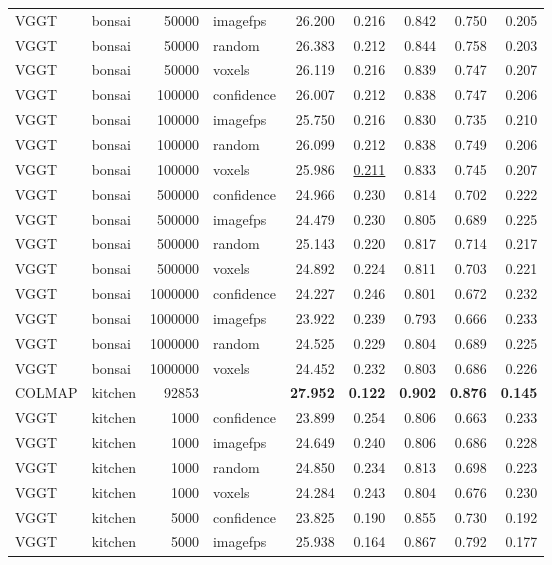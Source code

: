 \begin{table}[H]
\begin{tabular}{llrlrrrrr}
VGGT & bonsai & 50000 & imagefps & 26.200 & 0.216 & 0.842 & 0.750 & 0.205 \\
VGGT & bonsai & 50000 & random & 26.383 & 0.212 & 0.844 & 0.758 & 0.203 \\
VGGT & bonsai & 50000 & voxels & 26.119 & 0.216 & 0.839 & 0.747 & 0.207 \\
VGGT & bonsai & 100000 & confidence & 26.007 & 0.212 & 0.838 & 0.747 & 0.206 \\
VGGT & bonsai & 100000 & imagefps & 25.750 & 0.216 & 0.830 & 0.735 & 0.210 \\
VGGT & bonsai & 100000 & random & 26.099 & 0.212 & 0.838 & 0.749 & 0.206 \\
VGGT & bonsai & 100000 & voxels & 25.986 & \underline{0.211} & 0.833 & 0.745 & 0.207 \\
VGGT & bonsai & 500000 & confidence & 24.966 & 0.230 & 0.814 & 0.702 & 0.222 \\
VGGT & bonsai & 500000 & imagefps & 24.479 & 0.230 & 0.805 & 0.689 & 0.225 \\
VGGT & bonsai & 500000 & random & 25.143 & 0.220 & 0.817 & 0.714 & 0.217 \\
VGGT & bonsai & 500000 & voxels & 24.892 & 0.224 & 0.811 & 0.703 & 0.221 \\
VGGT & bonsai & 1000000 & confidence & 24.227 & 0.246 & 0.801 & 0.672 & 0.232 \\
VGGT & bonsai & 1000000 & imagefps & 23.922 & 0.239 & 0.793 & 0.666 & 0.233 \\
VGGT & bonsai & 1000000 & random & 24.525 & 0.229 & 0.804 & 0.689 & 0.225 \\
VGGT & bonsai & 1000000 & voxels & 24.452 & 0.232 & 0.803 & 0.686 & 0.226 \\
\midrule
COLMAP & kitchen & 92853 &  & \textbf{27.952} & \textbf{0.122} & \textbf{0.902} & \textbf{0.876} & \textbf{0.145} \\
VGGT & kitchen & 1000 & confidence & 23.899 & 0.254 & 0.806 & 0.663 & 0.233 \\
VGGT & kitchen & 1000 & imagefps & 24.649 & 0.240 & 0.806 & 0.686 & 0.228 \\
VGGT & kitchen & 1000 & random & 24.850 & 0.234 & 0.813 & 0.698 & 0.223 \\
VGGT & kitchen & 1000 & voxels & 24.284 & 0.243 & 0.804 & 0.676 & 0.230 \\
VGGT & kitchen & 5000 & confidence & 23.825 & 0.190 & 0.855 & 0.730 & 0.192 \\
VGGT & kitchen & 5000 & imagefps & 25.938 & 0.164 & 0.867 & 0.792 & 0.177 \\

\end{tabular}
\end{table}
